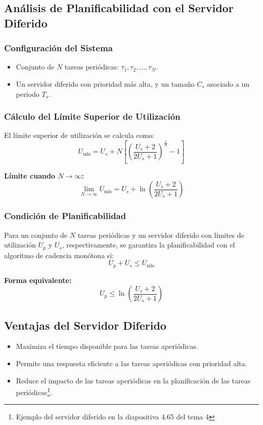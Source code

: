 \documentclass[a4paper,12pt]{article}
\begin{document}
\subsection{Análisis de Planificabilidad con el Servidor Diferido}

\subsubsection{Configuración del Sistema}
\begin{itemize}
    \item Conjunto de \(N\) tareas periódicas: \(\tau_1, \tau_2, \dots, \tau_N\).
    \item Un servidor diferido con prioridad más alta, y un tamaño \(C_s\) asociado a un periodo \(T_s\).
\end{itemize}

\subsubsection{Cálculo del Límite Superior de Utilización}
El límite superior de utilización se calcula como:
\[
U_{\text{mls}} = U_s + N \left[\left(\frac{U_s + 2}{2U_s + 1}\right)^{\frac{1}{N}} - 1\right]
\]

\textbf{Límite cuando \(N \to \infty\):}
\[
\lim_{N \to \infty} U_{\text{mls}} = U_s + \ln\left(\frac{U_s + 2}{2U_s + 1}\right)
\]

\subsubsection{Condición de Planificabilidad}
Para un conjunto de \(N\) tareas periódicas y un servidor diferido con límites de utilización \(U_p\) y \(U_s\), respectivamente, se garantiza la planificabilidad con el algoritmo de cadencia monótona si:
\[
U_p + U_s \leq U_{\text{mls}}
\]

\textbf{Forma equivalente:}
\[
U_p \leq \ln\left(\frac{U_s + 2}{2U_s + 1}\right)
\]

\subsection{Ventajas del Servidor Diferido}
\begin{itemize}
    \item Maximiza el tiempo disponible para las tareas aperiódicas.
    \item Permite una respuesta eficiente a las tareas aperiódicas con prioridad alta.
    \item Reduce el impacto de las tareas aperiódicas en la planificación de las tareas periódicas\footnote{Ejemplo del servidor diferido en la diapositiva 4.65 del tema 4}.
\end{itemize}
\end{document}
